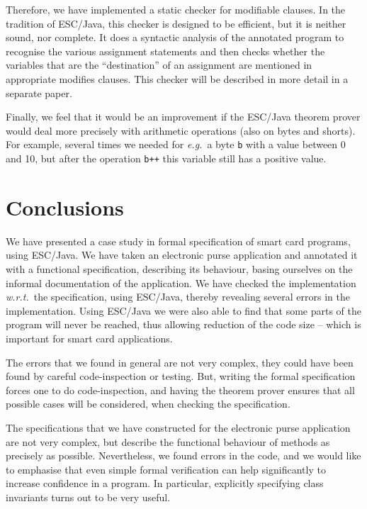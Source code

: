 \documentclass[a4paper]{llncs}
\begin{document}
Therefore, we have implemented a static checker for modifiable
clauses. In the tradition of ESC/Java, this checker is designed to be
efficient, but it is neither sound, nor complete. It does a syntactic
analysis of the annotated program to recognise the various assignment
statements and then checks whether the variables that are the
``destination'' of an assignment are mentioned in appropriate modifies
clauses. This checker will be described in more detail in a separate
paper.

Finally, we feel that it would be an improvement if the ESC/Java
theorem prover would deal more precisely with arithmetic operations
(also on bytes and shorts). For example, several times we needed
for \emph{e.g.}~a byte \texttt{b} with a value between 0 and 10, but
after
the operation \texttt{b++} this variable still has a positive value.






\section{Conclusions}
\label{SectConcl}

We have presented a case study in formal specification of smart card
programs, using ESC/Java. We have taken an electronic purse
application and annotated it with a functional specification,
describing its behaviour, basing ourselves on the informal
documentation of the application. We have checked the implementation
\emph{w.r.t.}~the specification, using ESC/Java, thereby revealing
several errors in the implementation. Using ESC/Java we were also able 
to find that some parts of the program will never be reached, thus
allowing reduction of the code size -- which is important for smart
card applications. 

The errors that we found in general are not very complex, they could
have been found by careful code-inspection or testing. But, writing
the formal specification forces one to do code-inspection, and having
the theorem prover ensures that all possible cases will be
considered, when checking the specification.

The specifications that we have constructed for the electronic purse
application are not very complex, but describe the functional
behaviour of methods as precisely as possible. Nevertheless, we found
errors in the code, and we would like to emphasise that even simple
formal verification can help significantly to increase confidence in a
program. In particular, explicitly specifying class invariants turns
out to be very useful.
\end{document}
